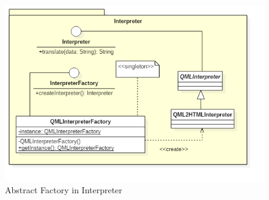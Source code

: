 \begin{itemize}
	\begin{figure}[h!]
	\begin{center}
		\includegraphics[scale=0.5]{../images/interpreterClass.png}
		\caption{Abstract Factory in Interpreter}
	\end{center}
	\end{figure}
	\end{itemize}
	
